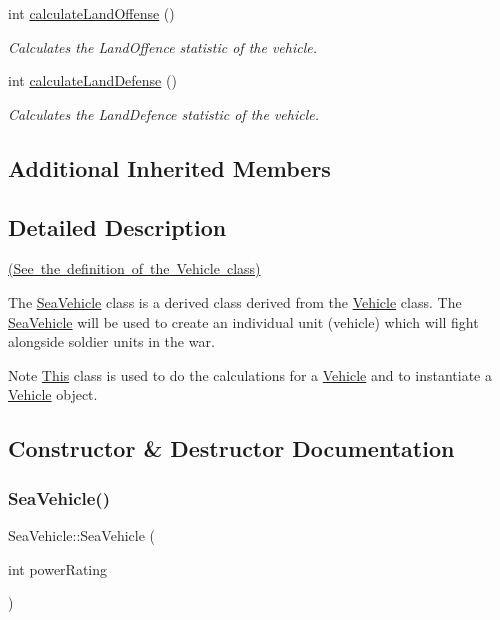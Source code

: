 \begin{DoxyCompactItemize}
int \mbox{\hyperlink{class_sea_vehicle_a6a07126cd3e346097f967e3a8038622f}{calculate\+Land\+Offense}} ()
\begin{DoxyCompactList}\small\item\em Calculates the Land\+Offence statistic of the vehicle. \end{DoxyCompactList}\item 
int \mbox{\hyperlink{class_sea_vehicle_a0c86a5fe86057562bb7e7547e0183c8d}{calculate\+Land\+Defense}} ()
\begin{DoxyCompactList}\small\item\em Calculates the Land\+Defence statistic of the vehicle. \end{DoxyCompactList}\end{DoxyCompactItemize}
\subsection*{Additional Inherited Members}


\subsection{Detailed Description}
\mbox{\hyperlink{_vehicle_8h_source}{(See the definition of the Vehicle class)}}

The \mbox{\hyperlink{class_sea_vehicle}{Sea\+Vehicle}} class is a derived class derived from the \mbox{\hyperlink{class_vehicle}{Vehicle}} class. The \mbox{\hyperlink{class_sea_vehicle}{Sea\+Vehicle}} will be used to create an individual unit (vehicle) which will fight alongside soldier units in the war. \begin{DoxyNote}{Note}
\mbox{\hyperlink{class_this}{This}} class is used to do the calculations for a \mbox{\hyperlink{class_vehicle}{Vehicle}} and to instantiate a \mbox{\hyperlink{class_vehicle}{Vehicle}} object. 
\end{DoxyNote}


\subsection{Constructor \& Destructor Documentation}
\mbox{\label{class_sea_vehicle_a9e0bd06195fbb91413c97a8572ed9345}} 
\subsubsection{\texorpdfstring{SeaVehicle()}{SeaVehicle()}}
{\footnotesize\ttfamily Sea\+Vehicle\+::\+Sea\+Vehicle (\begin{DoxyParamCaption}\item[{int}]{power\+Rating }\end{DoxyParamCaption})}



